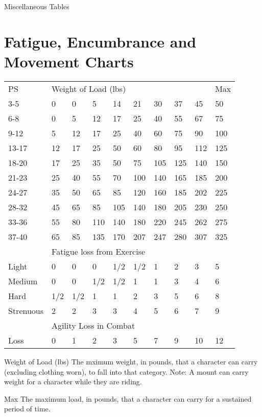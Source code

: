 \begin{Tables}{Miscellaneous Tables}

\section{Fatigue, Encumbrance and Movement Charts}

\begin{tabularx}{\linewidth}{Xlllllllll}
PS		& \multicolumn{8}{l}{Weight of Load (lbs)} & Max \\
3-5		& 0	& 0	& 5	& 14	& 21	& 30	& 37	& 45	& 50 \\
6-8		& 0	& 5	& 12	& 17	& 25	& 40	& 55	& 67	& 75 \\
9-12		& 5	& 12	& 17	& 25	& 40	& 60	& 75	& 90	& 100 \\
13-17		& 12	& 17	& 25	& 50	& 60	& 80	& 95	& 112	& 125 \\
18-20		& 17	& 25	& 35	& 50	& 75	& 105	& 125	& 140	& 150 \\
21-23		& 25	& 40	& 55	& 70	& 100	& 140	& 165	& 185	& 200 \\
24-27		& 35	& 50	& 65	& 85	& 120	& 160	& 185	& 202	& 225 \\
28-32		& 45	& 65	& 85	& 105	& 140	& 180	& 205	& 230	& 250 \\
33-36		& 55	& 80	& 110	& 140	& 180	& 220	& 245	& 262	& 275 \\
37-40		& 65	& 85	& 135	& 170	& 207	& 247	& 280	& 307	& 325 \\
 & \multicolumn{8}{l}{Fatigue loss from Exercise} \\ 
Light 		& 0	& 0	& 0	& 1/2	& 1/2	& 1	& 2	& 3	& 5 \\
Medium 		& 0	& 0	& 1/2	& 1/2	& 1	& 1	& 3	& 4	& 6 \\
Hard 		& 1/2	& 1/2	& 1	& 1	& 2	& 3	& 5	& 6	& 8 \\
Strenuous 	& 2	& 2	& 3	& 3	& 4	& 5	& 6	& 7	& 9 \\
 & \multicolumn{8}{l}{Agility Loss in Combat} \\
Loss 		& 0	& 1	& 2	& 3	& 5	& 7	& 9	& 10	& 12 \\
\end{tabularx}

Weight of Load (lbs) The mximum weight, in pounds, that a character
can carry (excluding clothing worn), to fall into that category. Note:
A mount can carry weight for a character while they are riding.

Max The maximum load, in pounds, that a character can carry for a
sustained period of time.


\end{Tables}
